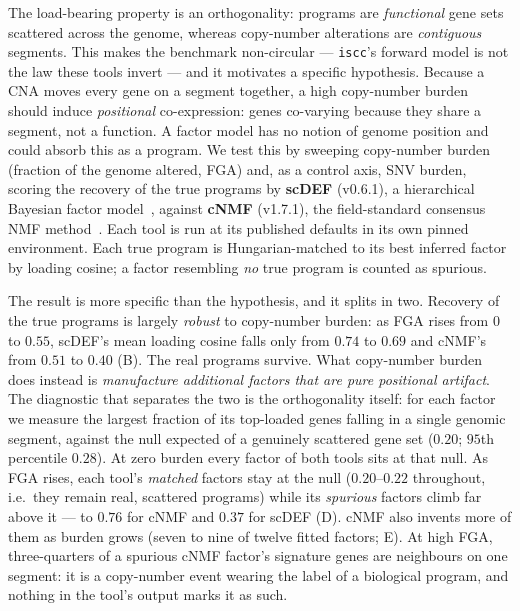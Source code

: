 \documentclass{article}
\begin{document}
The load-bearing property is an orthogonality: programs are \emph{functional} gene sets scattered
across the genome, whereas copy-number alterations are \emph{contiguous} segments. This makes the
benchmark non-circular --- \texttt{iscc}'s forward model is not the law these tools invert --- and it
motivates a specific hypothesis. Because a CNA moves every gene on a segment together, a high
copy-number burden should induce \emph{positional} co-expression: genes co-varying because they share
a segment, not a function. A factor model has no notion of genome position and could absorb this as a
program. We test this by sweeping copy-number burden (fraction of the genome altered, FGA) and, as a
control axis, SNV burden, scoring the recovery of the true programs by \textbf{scDEF} (v0.6.1), a
hierarchical Bayesian factor model~\cite{ferreira_scdef_2024}, against \textbf{cNMF} (v1.7.1), the
field-standard consensus NMF method~\cite{kotliar_cnmf_2019}. Each tool is run at its published
defaults in its own pinned environment. Each true program is Hungarian-matched to its best inferred
factor by loading cosine; a factor resembling \emph{no} true program is counted as spurious.

The result is more specific than the hypothesis, and it splits in two. Recovery of the true programs
is largely \emph{robust} to copy-number burden: as FGA rises from $0$ to $0.55$, scDEF's mean loading
cosine falls only from $0.74$ to $0.69$ and cNMF's from $0.51$ to $0.40$ (B). The
real programs survive. What copy-number burden does instead is \emph{manufacture additional factors
that are pure positional artifact}. The diagnostic that separates the two is the orthogonality
itself: for each factor we measure the largest fraction of its top-loaded genes falling in a single
genomic segment, against the null expected of a genuinely scattered gene set ($0.20$; $95$th
percentile $0.28$). At zero burden every factor of both tools sits at that null. As FGA rises, each
tool's \emph{matched} factors stay at the null ($0.20$--$0.22$ throughout, i.e.\ they remain real,
scattered programs) while its \emph{spurious} factors climb far above it --- to $0.76$ for cNMF and
$0.37$ for scDEF (D). cNMF also invents more of them as burden grows (seven to
nine of twelve fitted factors; E). At high FGA, three-quarters of a spurious cNMF
factor's signature genes are neighbours on one segment: it is a copy-number event wearing the label
of a biological program, and nothing in the tool's output marks it as such.
\end{document}
